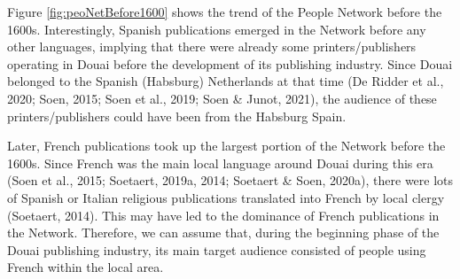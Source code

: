 \documentclass[12pt,a4paper,oneside]{book}
\begin{document}
\begin{sloppypar}
Figure \ref{fig:peoNetBefore1600} shows the trend of the People Network before the 1600s. Interestingly, Spanish publications emerged in the Network before any other languages, implying that there were already some printers/publishers operating in Douai before the development of its publishing industry. Since Douai belonged to the Spanish (Habsburg) Netherlands at that time (De Ridder et al., 2020; Soen, 2015; Soen et al., 2019; Soen \& Junot, 2021), the audience of these printers/publishers could have been from the Habsburg Spain.

Later, French publications took up the largest portion of the Network before the 1600s. Since French was the main local language around Douai during this era (Soen et al., 2015; Soetaert, 2019a, 2014; Soetaert \& Soen, 2020a), there were lots of Spanish or Italian religious publications translated into French by local clergy (Soetaert, 2014). This may have led to the dominance of French publications in the Network. Therefore, we can assume that, during the beginning phase of the Douai publishing industry, its main target audience consisted of people using French within the local area.


\end{sloppypar}
\end{document}
